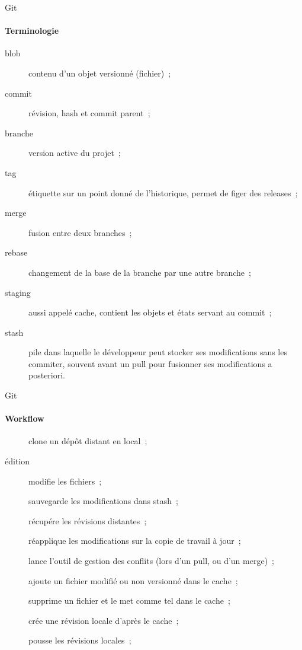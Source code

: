\begin{frame}{Git}
\framesubtitle{Terminologie}
\begin{description}
 \item [blob] contenu d'un objet versionné (fichier)~;
 \pause
 \item [commit] révision, hash et commit parent~;
 \pause
 \item [branche] version active du projet~;
 \pause
 \item [tag] étiquette sur un point donné de l'historique, permet de figer des releases~;
 \pause
 \item [merge] fusion entre deux branches~;
 \pause
 \item [rebase] changement de la base de la branche par une autre branche~;
 \pause
 \item [staging] aussi appelé cache, contient les objets et états servant au commit~;
 \pause
 \item [stash] pile dans laquelle le développeur peut stocker ses modifications sans les commiter, souvent avant un pull pour fusionner ses modifications a posteriori.
\end{description}
\end{frame}

\begin{frame}{Git}
\framesubtitle{Workflow}
\begin{description}
 \item [] clone un dépôt distant en local~;
 \pause
 \item [édition] modifie les fichiers~;
 \pause
 \item [] sauvegarde les modifications dans stash~;
 \pause
 \item [] récupére les révisions distantes~;
 \pause
 \item [] réapplique les modifications sur la copie de travail à jour~;
 \pause
 \item [] lance l'outil de gestion des conflits (lors d'un pull, ou d'un merge)~;
 \pause
 \item [] ajoute un fichier modifié ou non versionné dans le cache~;
 \pause
 \item [] supprime un fichier et le met comme tel dans le cache~;
 \pause
 \item [] crée une révision locale d'après le cache~;
 \pause
 \item [] pousse les révisions locales~;
\end{description}
\end{frame}
 
